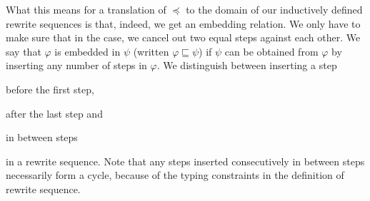 What this means for a translation of $\preceq$ to the domain of our
inductively defined rewrite sequences is that, indeed, we get an embedding
relation. We only have to make sure that in the
 case, we cancel out two
equal steps against each other.
We say that $\varphi$ is embedded in $\psi$ (written $\varphi
\sqsubseteq \psi$) if $\psi$ can be obtained from $\varphi$ by inserting
any number of steps in $\varphi$. We distinguish between inserting a step
\begin{inparaenum}[(i)]
  \item before the first step,
  \item after the last step and
  \item in between steps
\end{inparaenum}
in a rewrite sequence. Note that any steps inserted consecutively in between
steps necessarily form a cycle, because of the typing constraints in
the definition of rewrite sequence.
